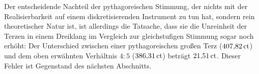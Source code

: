 Der entscheidende Nachteil der pythagoreischen Stimmung, der nichts mit der
Realisierbarkeit auf einem diskretisierenden Instrument zu tun hat, sondern rein
theoretischer Natur ist, ist allerdings die Tatsache, dass sie die Unreinheit
der Terzen in einem Dreiklang im Vergleich zur gleichstufigen Stimmung sogar
noch erhöht: Der Unterschied zwischen einer pythagoreischen großen Terz
($407{,}82\,\text{ct}$) und dem oben erwähnten Verhältnis $4:5$
($386{,}31\,\text{ct}$) beträgt $21{,}51\,\text{ct}$. Dieser Fehler ist Gegenstand
des nächsten Abschnitts.

